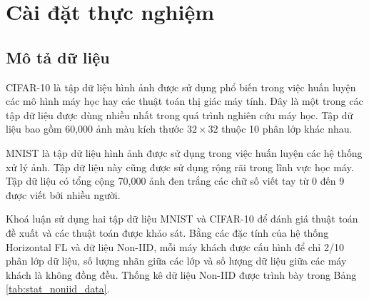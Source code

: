 \chapter{Cài đặt thực nghiệm}
\label{Chapter4}

\section{Mô tả dữ liệu}

CIFAR-10 \cite{cifar-10} là tập dữ liệu hình ảnh được sử dụng phổ biến trong việc huấn luyện các mô hình máy học hay các thuật toán thị giác máy tính. Đây là một trong các tập dữ liệu được dùng nhiều nhất trong quá trình nghiên cứu máy học. Tập dữ liệu bao gồm 60,000 ảnh màu kích thước $32\times 32$ thuộc 10 phân lớp khác nhau.

MNIST \cite{mnist} là tập dữ liệu hình ảnh được sử dụng trong việc huấn luyện các hệ thống xử lý ảnh. Tập dữ liệu này cũng được sử dụng rộng rãi trong lĩnh vực học máy. Tập dữ liệu có tổng cộng 70,000 ảnh đen trắng các chữ số viết tay từ 0 đến 9 được viết bởi nhiều người.

Khoá luận sử dụng hai tập dữ liệu MNIST và CIFAR-10 để đánh giá thuật toán đề xuất và các thuật toán được khảo sát. Bằng các đặc tính của hệ thống Horizontal FL và dữ liệu Non-IID, mỗi máy khách được cấu hình để chỉ 2/10 phân lớp dữ liệu, số lượng nhãn giữa các lớp và số lượng dữ liệu giữa các máy khách là không đồng đều. Thống kê dữ liệu Non-IID được trình bày trong Bảng \ref{tab:stat_noniid_data}.

\begin{table}[H]
    \caption{Thống kê trên hai tập dữ liệu MNIST và CIFAR-10 (dữ liệu Non-IID)}
    \label{tab:stat_noniid_data}
\end{table}

